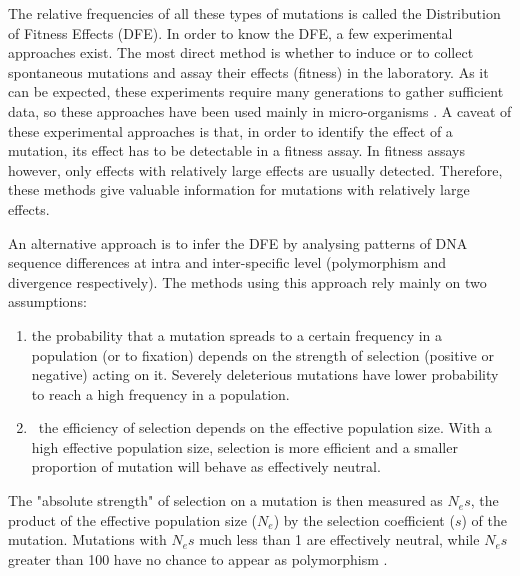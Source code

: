 The relative frequencies of all these types of mutations is called the Distribution of Fitness Effects (DFE).
In order to know the DFE, a few experimental approaches exist. The most direct method is whether to induce \citep{Sanjuan2004} or to collect \citep{MUKAI1964} spontaneous mutations and assay their effects (fitness) in the laboratory.
As it can be expected, these experiments require many generations to gather sufficient data, so these approaches have been used mainly in micro-organisms \citep{Eyre-Walker2007}.
A caveat of these experimental approaches is that, in order to identify the effect of a mutation, its effect has to be detectable in a fitness assay. In fitness assays however, only effects with relatively large effects are usually detected. Therefore, these methods give valuable information for mutations with relatively large effects.

An alternative approach is to infer the DFE by analysing patterns of DNA sequence differences at intra and inter-specific level (polymorphism and divergence respectively).
The methods using this approach rely mainly on two assumptions:
\begin{enumerate}
\item  the probability that a mutation spreads to a certain frequency in a population (or to fixation) depends on the strength of selection (positive or negative) acting on it.
Severely deleterious mutations have lower probability to reach a high frequency in a population.
\item\ the efficiency of selection depends on the effective population size. 
With a high effective population size, selection is more efficient and a smaller proportion of mutation will behave as effectively neutral.
\end{enumerate}
%
The "absolute strength" of selection on a mutation is then measured as $N_{e}s$, the product of the effective population size ($N_{e}$) by the selection coefficient ($s$) of the mutation. Mutations with $N_{e}s$ much less than 1 are effectively neutral, while $N_{e}s$ greater than 100 have no chance to appear as polymorphism \citep{Eyre-Walker2007}.

